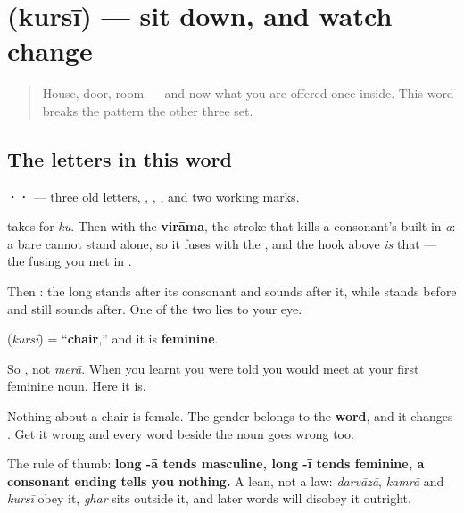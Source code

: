 \section[\texorpdfstring{\hi{कुर्सी} (kursī)}{कुर्सी (kursī)}]{ (kursī) — sit down, and watch  change}

\label{lesson:HI-C36-kursi}



\begin{quote}
House, door, room — and now what you are offered once inside. This word breaks the pattern the other three set.
\end{quote}

\subsection*{The letters in this word}
\textbf{··} — three old letters, \textbf{}, \textbf{}, \textbf{}, and two working marks.

\textbf{} takes \textbf{} for \emph{ku}. Then \textbf{} with the \textbf{virāma}, the stroke that kills a consonant's built-in \emph{a}: a bare \textbf{} cannot stand alone, so it fuses with the \textbf{}, and the hook above \textbf{} \emph{is} that \textbf{} — the fusing you met in \textbf{}.

Then \textbf{}: the long \textbf{} stands after its consonant and sounds after it, while \textbf{} stands before and still sounds after. One of the two lies to your eye.

\begin{grammarlens}[title={Grammar Lens: your first feminine noun}]
\textbf{} (\emph{kursī}) = \textquotedblleft{}\textbf{chair},\textquotedblright{} and it is \textbf{feminine}.

So \textbf{ }, not \emph{merā}. When you learnt \textbf{} you were told you would meet \textbf{} at your first feminine noun. Here it is.

Nothing about a chair is female. The gender belongs to the \textbf{word}, and it changes \textbf{}. Get it wrong and every word beside the noun goes wrong too.
\end{grammarlens}

\begin{grammarlens}[title={Grammar Lens: the lean, and where it leans wrong}]
The rule of thumb: \textbf{long -ā tends masculine, long -ī tends feminine, a consonant ending tells you nothing.} A lean, not a law: \emph{darvāzā}, \emph{kamrā} and \emph{kursī} obey it, \emph{ghar} sits outside it, and later words will disobey it outright.
\end{grammarlens}


